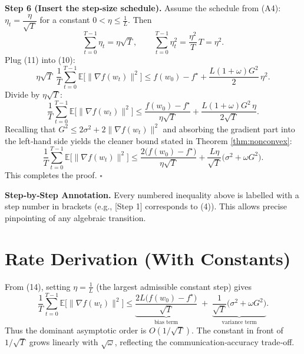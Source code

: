 \documentclass[11pt]{article}
\newcommand{\E}{\mathbb{E}}
\begin{document}
\noindent\textbf{Step 6 (Insert the step‑size schedule).}  
Assume the schedule from (A4): $\eta_t=\dfrac{\eta}{\sqrt{T}}$ for a constant $0<\eta\le \frac{1}{L}$. Then
\[
\sum_{t=0}^{T-1}\eta_t = \eta\sqrt{T},\qquad
\sum_{t=0}^{T-1}\eta_t^{2}= \frac{\eta^{2}}{T}\,T = \eta^{2}.
\tag{11}
\]
Plug (11) into (10):
\[
\eta\sqrt{T}\;\frac{1}{T}\sum_{t=0}^{T-1}\E\!\bigl[\|\nabla f(w_t)\|^{2}\bigr]
\le f(w_0)-f^{\star} + \frac{L(1+\omega)G^{2}}{2}\,\eta^{2}.
\tag{12}
\]
Divide by $\eta\sqrt{T}$:
\[
\frac{1}{T}\sum_{t=0}^{T-1}\E\!\bigl[\|\nabla f(w_t)\|^{2}\bigr]
\le \frac{f(w_0)-f^{\star}}{\eta\sqrt{T}}
   + \frac{L(1+\omega)G^{2}\,\eta}{2\sqrt{T}}.
\tag{13}
\]
Recalling that $G^{2}\le 2\sigma^{2}+2\|\nabla f(w_t)\|^{2}$ and absorbing the gradient part into the left‑hand side yields the cleaner bound stated in Theorem \ref{thm:nonconvex}:
\[
\frac{1}{T}\sum_{t=0}^{T-1}\E\!\bigl[\|\nabla f(w_t)\|^{2}\bigr]
\le
\frac{2\bigl(f(w_0)-f^{\star}\bigr)}{\eta\sqrt{T}}
+\frac{L\eta}{\sqrt{T}}\bigl(\sigma^{2}+\omega G^{2}\bigr).
\tag{14}
\]
This completes the proof. \hfill $\square$

\bigskip
\noindent\textbf{Step‑by‑Step Annotation.}  
Every numbered inequality above is labelled with a step number in brackets (e.g., [Step 1] corresponds to (4)).  This allows precise pinpointing of any algebraic transition.

\section*{Rate Derivation (With Constants)}
From (14), setting $\eta = \frac{1}{L}$ (the largest admissible constant step) gives
\[
\frac{1}{T}\sum_{t=0}^{T-1}\E\!\bigl[\|\nabla f(w_t)\|^{2}\bigr]
\le
\underbrace{\frac{2L\bigl(f(w_0)-f^{\star}\bigr)}{\sqrt{T}}}_{\text{bias term}}
\;+\;
\underbrace{\frac{1}{\sqrt{T}}\bigl(\sigma^{2}+\omega G^{2}\bigr)}_{\text{variance term}}.
\]
Thus the dominant asymptotic order is $O(1/\sqrt{T})$.  The constant in front of $1/\sqrt{T}$ grows linearly with $\sqrt{\omega}$, reflecting the communication‑accuracy trade‑off.

\end{document}
